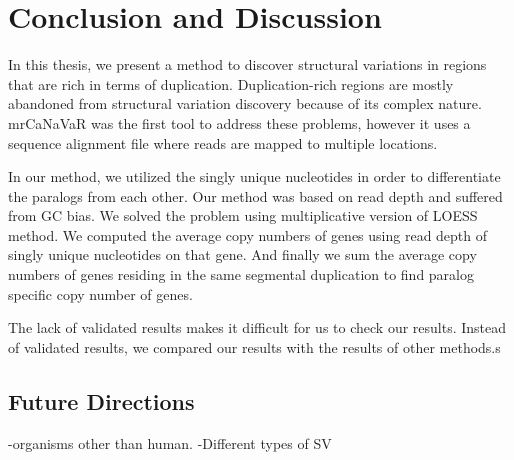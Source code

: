 \chapter{Conclusion and Discussion}
In this thesis, we present a method to discover structural variations in regions that are rich in terms of duplication. Duplication-rich regions are mostly abandoned from 
structural variation discovery because of its complex nature. mrCaNaVaR was the first tool to address these problems, however it uses a sequence alignment file where reads are mapped to multiple locations. 

In our method, we utilized the singly unique nucleotides in order to differentiate the paralogs from each other. Our method was based on read depth and suffered from GC bias. We solved the problem using multiplicative version of LOESS method. We computed the average copy numbers of genes using read depth of singly unique nucleotides on that gene. And finally we sum the average copy numbers of genes residing in the same segmental duplication to find paralog specific copy number of genes.

The lack of validated results makes it difficult for us to check our results. Instead of validated results, we compared our results with the results of other methods.s

\section{Future Directions}

-organisms other than human.
-Different types of SV